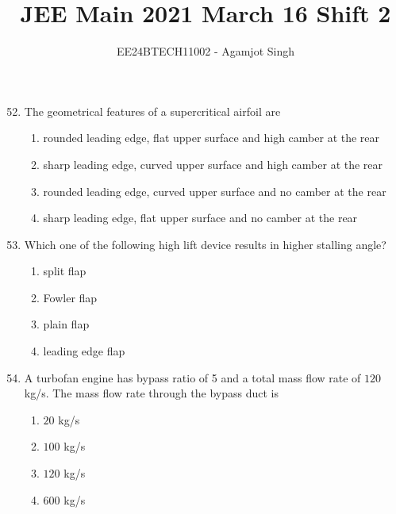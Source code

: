 \documentclass[journal,onecolumn]{IEEEtran}
\theoremstyle{remark}
\begin{document}

\vspace{3cm}

\title{JEE Main 2021 March 16 Shift 2}
\author{EE24BTECH11002 - Agamjot Singh}
\maketitle

\renewcommand{\thefigure}{\theenumi}
\renewcommand{\thetable}{\theenumi}

\begin{enumerate}
    \setcounter{enumi}{51}

    \item The geometrical features of a supercritical airfoil are

	\begin{enumerate}
		\item rounded leading edge, flat upper surface and high camber at the rear
		\item sharp leading edge, curved upper surface and high camber at the rear
		\item rounded leading edge, curved upper surface and no camber at the rear
		\item sharp leading edge, flat upper surface and no camber at the rear
	\end{enumerate}

    \item Which one of the following high lift device results in higher stalling angle?

	\begin{enumerate}
		\item split flap
		\item Fowler flap
		\item plain flap
		\item leading edge flap
	\end{enumerate}

    \item A turbofan engine has bypass ratio of 5 and a total mass flow rate of $120$ kg/s. The mass flow rate through the bypass duct is

	\begin{enumerate}
		\item $20$ kg/s
		\item $100$ kg/s
		\item $120$ kg/s
		\item $600$ kg/s
	\end{enumerate}



\end{enumerate}
\end{document}

